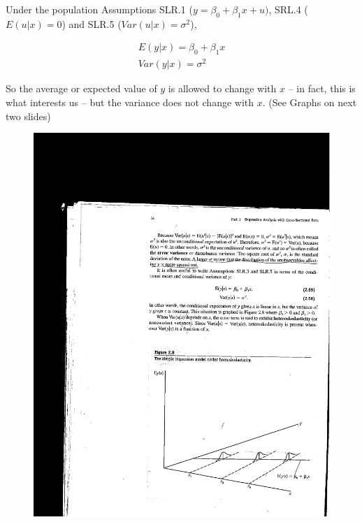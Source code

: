 \documentclass[notes=show]{beamer}
\begin{document}
\begin{frame}[plain]

Under the population Assumptions SLR.1 ($y=\beta_{0}+\beta _{1}x+u)$, SRL.4 ($E(u|x)=0$) and SLR.5 ($Var(u|x)=\sigma ^{2}$),

 \begin{eqnarray*}
  E(y|x)=\beta _{0}+\beta _{1}x \\
  Var(y|x)=\sigma ^{2}
 \end{eqnarray*}

 So the average or expected value of $y$ is allowed to change with $x$ -- in fact, this is what interests us -- but the variance does not change with $x$. (See Graphs on next two slides)
\end{frame}


\begin{frame}[plain]

\begin{figure}
\includegraphics[scale=0.7]{./lecture_includes/wooldridge_fig28.pdf}
\end{figure}
\end{frame}
\end{document}
